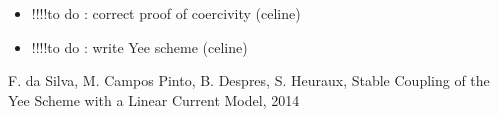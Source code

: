 \documentclass[proc]{edpsmath}
\begin{document}
\begin{itemize}
\item !!!!to do : correct proof of coercivity (celine)
\item !!!!to do : write Yee scheme 			(celine)

\end{itemize}







\begin{thebibliography}{99}
 F. da Silva, M. Campos Pinto, B. Despres, S. Heuraux, Stable Coupling of the Yee Scheme with a Linear Current Model,
2014
\end{thebibliography}
\end{document}
